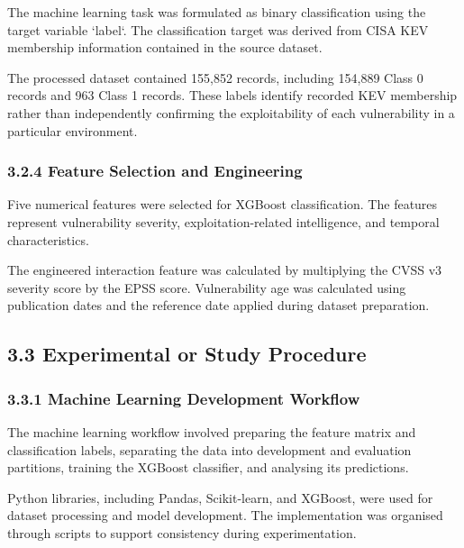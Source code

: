 \documentclass[
]{article}
\begin{document}
The machine learning task was formulated as binary classification using
the target variable `label`. The classification target was derived from
CISA KEV membership information contained in the source dataset.

The processed dataset contained 155,852 records, including 154,889 Class
0 records and 963 Class 1 records. These labels identify recorded KEV
membership rather than independently confirming the exploitability of
each vulnerability in a particular environment.

\hypertarget{feature-selection-and-engineering}{%
\subsubsection{3.2.4 Feature Selection and
Engineering}\label{feature-selection-and-engineering}}

Five numerical features were selected for XGBoost classification. The
features represent vulnerability severity, exploitation-related
intelligence, and temporal characteristics.

The engineered interaction feature was calculated by multiplying the
CVSS v3 severity score by the EPSS score. Vulnerability age was
calculated using publication dates and the reference date applied during
dataset preparation.

\hypertarget{experimental-or-study-procedure}{%
\subsection{3.3 Experimental or Study
Procedure}\label{experimental-or-study-procedure}}

\hypertarget{machine-learning-development-workflow}{%
\subsubsection{3.3.1 Machine Learning Development
Workflow}\label{machine-learning-development-workflow}}

The machine learning workflow involved preparing the feature matrix and
classification labels, separating the data into development and
evaluation partitions, training the XGBoost classifier, and analysing
its predictions.

Python libraries, including Pandas, Scikit-learn, and XGBoost, were used
for dataset processing and model development. The implementation was
organised through scripts to support consistency during experimentation.
\end{document}
